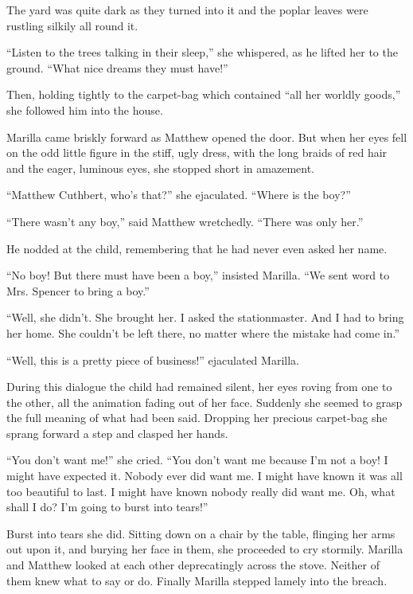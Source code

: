 \documentclass[a4paper]{article}
\begin{document}
{\rmfamily The yard was quite dark as they turned into it and the poplar leaves were rustling silkily all round it.

``Listen to the trees talking in their sleep,'' she whispered, as he lifted her to the ground. ``What nice dreams they must have!''

Then, holding tightly to the carpet-bag which contained ``all her worldly goods,'' she followed him into the house.

Marilla came briskly forward as Matthew opened the door. But when her eyes fell on the odd little figure in the stiff, ugly dress, with the long braids of red hair and the eager, luminous eyes, she stopped short in amazement.}

``Matthew Cuthbert, who's that?'' she ejaculated. ``Where is the boy?''

``There wasn't any boy,'' said Matthew wretchedly. ``There was only her.''

{\ttfamily He nodded at the child, remembering that he had never even asked her name.

``No boy! But there must have been a boy,'' insisted Marilla. ``We sent word to Mrs. Spencer to bring a boy.''

``Well, she didn't. She brought her. I asked the stationmaster. And I had to bring her home. She couldn't be left there, no matter where the mistake had come in.''

``Well, this is a pretty piece of business!'' ejaculated Marilla.}

During this dialogue the child had remained silent, her eyes roving from one to the other, all the animation fading out of her face. Suddenly she seemed to grasp the full meaning of what had been said. Dropping her precious carpet-bag she sprang forward a step and clasped her hands.

``You don't want me!'' she cried. ``You don't want me because I'm not a boy! I might have expected it. Nobody ever did want me. I might have known it was all too beautiful to last. I might have known nobody really did want me. Oh, what shall I do? I'm going to burst into tears!''

\sffamily Burst into tears she did. Sitting down on a chair by the table, flinging her arms out upon it, and burying her face in them, she proceeded to cry stormily. Marilla and Matthew looked at each other deprecatingly across the stove. Neither of them knew what to say or do. Finally Marilla stepped lamely into the breach.
\end{document}
